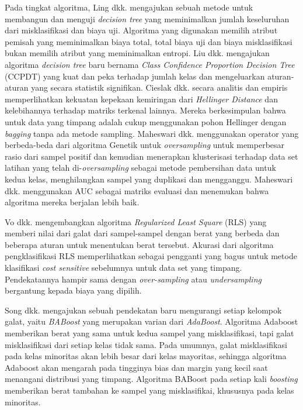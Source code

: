 \documentclass[12pt,a4paper,titlepage]{article}
\begin{document}
Pada tingkat algoritma, Ling dkk. \cite{ling2004decision} mengajukan sebuah metode untuk membangun dan menguji \textit{decision tree} yang meminimalkan jumlah keseluruhan dari misklasifikasi dan biaya uji.
Algoritma yang digunakan memilih atribut pemisah yang meminimalkan biaya total, total biaya uji dan biaya misklasifikasi bukan memilih atribut yang meminimalkan entropi.
Liu dkk. \cite{liu2010robust} mengajukan algoritma \textit{decision tree} baru bernama \textit{Class Confidence Proportion Decision Tree} (CCPDT) yang kuat dan peka terhadap jumlah kelas dan mengeluarkan aturan-aturan yang secara statistik signifikan.
Cieslak dkk. \cite{cieslak2012hellinger} secara analitis dan empiris memperlihatkan kekuatan kepekaan kemiringan dari \textit{Hellinger Distance} dan kelebihannya terhadap matriks terkenal lainnya.
Mereka berkesimpulan bahwa untuk data yang timpang adalah cukup menggunakan pohon Hellinger dengan \textit{bagging} tanpa ada metode sampling.
Maheswari dkk. \cite{maheshwari2011new} menggunakan operator yang berbeda-beda dari algoritma Genetik untuk \textit{oversampling} untuk memperbesar rasio dari sampel positif dan kemudian menerapkan klusterisasi terhadap data set latihan yang telah di-\textit{oversampling} sebagai metode pembersihan data untuk kedua kelas, menghilangkan sampel yang duplikasi dan mengganggu.
Maheswari dkk. menggunakan AUC sebagai matriks evaluasi dan menemukan bahwa algoritma mereka berjalan lebih baik.

Vo dkk. \cite{vo2007classification} mengembangkan algoritma \textit{Regularized Least Square} (RLS) yang memberi nilai dari galat dari sampel-sampel dengan berat yang berbeda dan beberapa aturan untuk menentukan berat tersebut.
Akurasi dari algoritma pengklasifikasi RLS memperlihatkan sebagai pengganti yang bagus untuk metode klasifikasi \textit{cost sensitive} sebelumnya untuk data set yang timpang.
Pendekatannya hampir sama dengan \textit{over-sampling} atau \hfill\break
\textit{under\-sampling} bergantung kepada biaya yang dipilih.

Song dkk. \cite{song2009improved} mengajukan sebuah pendekatan baru mengurangi setiap kelompok galat, yaitu \textit{BABoost} yang merupakan varian dari \textit{AdaBoost}.
Algoritma Adaboost memberikan berat yang sama untuk kedua sampel yang misklasifikasi, tapi galat misklasifikasi dari setiap kelas tidak sama.
Pada umumnya, galat misklasifikasi pada kelas minoritas akan lebih besar dari kelas mayoritas, sehingga algoritma Adaboost akan mengarah pada tingginya bias dan margin yang kecil saat menangani distribusi yang timpang.
Algoritma BABoost pada setiap kali \textit{boosting} memberikan berat tambahan ke sampel yang misklasifikai, khususnya pada kelas minoritas.
\end{document}
